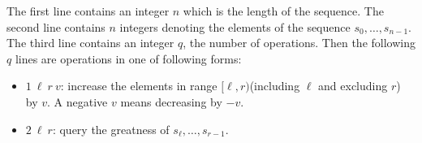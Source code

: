 The first line contains an integer $n$ which is the length of the sequence. 
The second line contains $n$ integers denoting the elements of the sequence $s_0,\dots,s_{n-1}$. 
The third line contains an integer $q$, the number of operations. 
Then the following $q$ lines are operations in one of following forms:

\begin{itemize}
\item $1~\ell~r~v$: increase the elements in range $[\ell, r)$(including $\ell$ and excluding $r$) by $v$. 
		A negative $v$ means decreasing by $-v$.
\item $2~\ell~r$: query the greatness of $s_\ell,\dots,s_{r-1}$.
\end{itemize}
